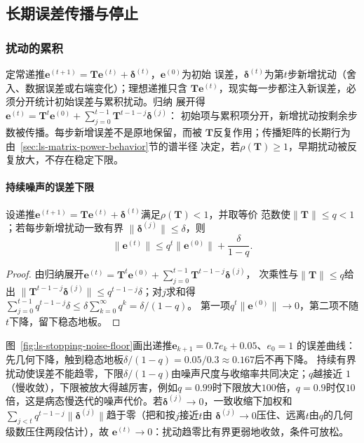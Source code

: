 \subsection{长期误差传播与停止}
\label{sec:ls-long-term-error}

\subsubsection{扰动的累积}

定常递推$\bm e^{(t+1)}=\bm T\bm e^{(t)}+\bm\delta^{(t)}$，$\bm e^{(0)}$为初始
误差，$\bm\delta^{(t)}$为第$t$步新增扰动（舍入、数据误差或右端变化）；理想递推只含
$\bm T\bm e^{(t)}$，现实每一步都注入新误差，必须分开统计初始误差与累积扰动。归纳
展开得$\bm e^{(t)}=\bm T^t\bm e^{(0)}+\sum_{j=0}^{t-1}\bm T^{t-1-j}\bm\delta^{(j)}$：
初始项与累积项分开，新增扰动按剩余步数被传播。每步新增误差不是原地保留，而被
$\bm T$反复作用；传播矩阵的长期行为由~\ref{sec:ls-matrix-power-behavior}节的谱半径
决定，若$\rho(\bm T)\geq1$，早期扰动被反复放大，不存在稳定下限。

\paragraph{持续噪声的误差下限}

\begin{theorem}[持续扰动下的稳态误差下限]
\label{thm:ls-noise-floor}
设递推$\bm e^{(t+1)}=\bm T\bm e^{(t)}+\bm\delta^{(t)}$满足$\rho(\bm T)<1$，并取等价
范数使$\lVert\bm T\rVert\leq q<1$；若每步新增扰动一致有界
$\lVert\bm\delta^{(j)}\rVert\leq\delta$，则
\begin{equation}
 \lVert\bm e^{(t)}\rVert
 \leq q^t\lVert\bm e^{(0)}\rVert+\frac{\delta}{1-q}.
 \label{eq:ls-noise-floor}
\end{equation}
\end{theorem}
\begin{proof}
由归纳展开$\bm e^{(t)}=\bm T^t\bm e^{(0)}+\sum_{j=0}^{t-1}\bm T^{t-1-j}\bm\delta^{(j)}$，
次乘性与$\lVert\bm T\rVert\leq q$给出
$\lVert\bm T^{t-1-j}\bm\delta^{(j)}\rVert\leq q^{t-1-j}\delta$；对$j$求和得
$\sum_{j=0}^{t-1}q^{t-1-j}\delta\leq\delta\sum_{k=0}^{\infty}q^k=\delta/(1-q)$。
第一项$q^t\lVert\bm e^{(0)}\rVert\to0$，第二项不随$t$下降，留下稳态地板。
\end{proof}
图~\ref{fig:ls-stopping-noise-floor}画出递推$\bm e_{k+1}=0.7e_k+0.05$、$e_0=1$
的误差曲线：先几何下降，触到稳态地板$\delta/(1-q)=0.05/0.3\approx0.167$后不再下降。
持续有界扰动使误差不能趋零，下限$\delta/(1-q)$由噪声尺度与收缩率共同决定；$q$越接近
$1$（慢收敛），下限被放大得越厉害，例如$q=0.99$时下限放大$100$倍，$q=0.9$时仅$10$
倍，这是病态慢迭代的噪声代价。若$\bm\delta^{(j)}\to0$，一致收缩下加权和
$\sum_{j<t}q^{t-1-j}\lVert\bm\delta^{(j)}\rVert$趋于零（把和按$j$接近$t$由
$\bm\delta^{(j)}\to0$压住、远离$t$由$q$的几何级数压住两段估计），故
$\bm e^{(t)}\to0$：扰动趋零比有界更弱地收敛，条件可放松。


